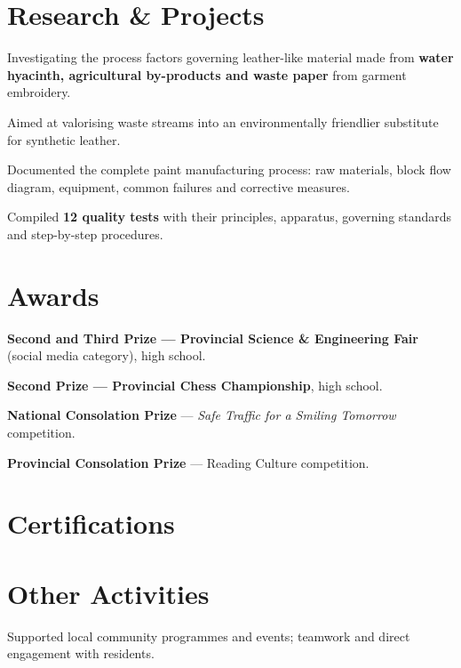 \documentclass{cvchem}
\begin{document}
\section[\iclab]{Research \& Projects}
\begin{cvitems}
  \item Investigating the process factors governing leather-like material made from \textbf{water hyacinth, agricultural by-products and waste paper} from garment embroidery.
  \item Aimed at valorising waste streams into an environmentally friendlier substitute for synthetic leather.
\end{cvitems}

\begin{cvitems}
  \item Documented the complete paint manufacturing process: raw materials, block flow diagram, equipment, common failures and corrective measures.
  \item Compiled \textbf{12 quality tests} with their principles, apparatus, governing standards and step-by-step procedures.
\end{cvitems}

\section[\icaward]{Awards}
\begin{cvitems}
  \item \textbf{Second and Third Prize --- Provincial Science \& Engineering Fair} (social media category), high school.
  \item \textbf{Second Prize --- Provincial Chess Championship}, high school.
  \item \textbf{National Consolation Prize} --- \textit{Safe Traffic for a Smiling Tomorrow} competition.
  \item \textbf{Provincial Consolation Prize} --- Reading Culture competition.
\end{cvitems}

\section[\icweb]{Certifications}
\begin{cvfields}[.25\linewidth]
\end{cvfields}

\section[\icgear]{Other Activities}
\begin{cvitems}
  \item Supported local community programmes and events; teamwork and direct engagement with residents.
\end{cvitems}
\end{document}
